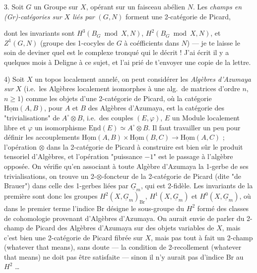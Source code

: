 \documentclass[11pt,a4paper]{article}
\begin{document}
3. Soit $G$ un Groupe sur $X$, opérant sur un faisceau abélien $N$. Les
\emph{champs en (Gr)-catégories sur $X$ liés par} $(G,N)$ forment une
2-catégorie de Picard,


dont les invariants sont $H^3(B_G \bmod X,N)$, $H^2(B_G \bmod X,N)$, et
$Z^1(G,N)$ (groupe des 1-cocyles de $G$ à coéfficients dans $N$) — je te laisse
le soin de deviner quel est le complexe tronqué qui le décrit ! J'ai écrit il y
a quelques mois à Deligne à ce sujet, et l'ai prié de t'envoyer une copie de
\struck{\ill{}} la lettre.

4) Soit $X$ un topos localement annelé, on peut considérer les \emph{Algèbres
d'Azumaya sur} $X$ (i.e.\ les Algèbres localement isomorphes à une alg.\ de
matrices d'ordre $n$, $n\geqslant 1$) comme les objets d'une 2-catégorie de
Picard, où la catégorie $\underline{\mathrm{Hom}}(A,B)$, pour $A$ et $B$ des
Algèbres d'Azumaya, est la catégorie des "trivialisations" de $A^{\circ}\otimes
B$, i.e.\ des couples $(E,\varphi)$, $E$ un Module localement libre et
$\varphi$ un isomorphisme $\underline{\mathrm{End}}(E)\simeq A^{\circ}\otimes
B$. Il faut travailler un peu pour définir les accouplements
$\underline{\mathrm{Hom}}(A,B)\times\underline{\mathrm{Hom}}(B,C)\to
\underline{\mathrm{Hom}}(A,C)$ ; l'opération $\otimes$ dans la 2-catégorie de
Picard à construire est bien sûr le produit tensoriel d'Algèbres, et
l'opération "puissance $-1$" est le passage à l'algèbre opposée. On vérifie
 qu'en associant à toute
Algèbre d'Azumaya la 1-gerbe de ses trivialisations, on trouve un
2-$\otimes$-foncteur de la 2-catégorie de Picard (dite "de Brauer") dans celle
des 1-gerbes liées par $\underline{G}_m$, qui est 2-fidèle. Les invariants de
la première sont donc les groupes $H^2(X,\underline{G}_m)_{\mathrm{Br}}$,
$H^1(X,\underline{G}_m)$ et $H^0(X,\underline{G}_m)$, où dans le premier terme
l'indice Br désigne le sous-groupe du $H^2$ formé des classes de cohomologie
provenant d'Algèbres d'Azumaya. On aurait envie de parler du 2-champ de Picard
des Algèbres d'Azumaya sur des objets variables de $X$, mais c'est bien une
2-catégorie de Picard fibrée sur $X$, mais pas tout à fait un 2-champ (whatever
that means), sans doute — la condition de 2-recollement (whatever that means)
ne doit pas être satisfaite — sinon il n'y aurait pas d'indice Br au $H^2$ …
\end{document}
